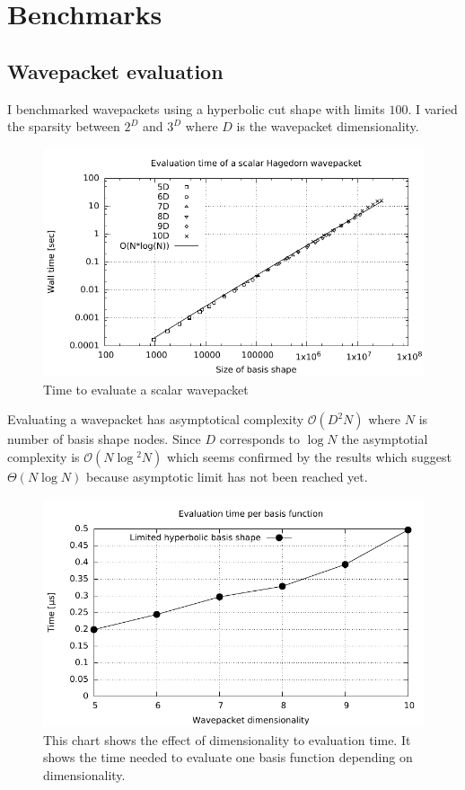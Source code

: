 \documentclass{article}
\begin{document}
\section{Benchmarks}

\subsection{Wavepacket evaluation}

I benchmarked wavepackets using a hyperbolic cut shape with limits \(100\).
I varied the sparsity between \(2^D\) and \(3^D\) where \(D\) is the wavepacket
dimensionality.

\begin{figure}[H]
  \centering
  \includegraphics[width=1.0\textwidth]{plots/hawp_eval_benchmark}
  \caption{Time to evaluate a scalar wavepacket}
  \label{fig:hawp_eval_benchmark}
\end{figure}

Evaluating a wavepacket has asymptotical complexity \(\mathcal{O}(D^2N)\) where
\(N\) is number of basis shape nodes.
Since \(D\) corresponds to \(\log{}N\) the asymptotial complexity is \(\mathcal{O}(N\log{}^2N)\)
which seems confirmed by the results which suggest \(\Theta(N\log{}N)\) because asymptotic limit
has not been reached yet.

\begin{figure}[H]
  \centering
  \includegraphics[width=1.0\textwidth]{plots/hawp_eval_efficiency}
  \caption{
    This chart shows the effect of dimensionality to evaluation time.
    It shows the time needed to evaluate one basis function depending
    on dimensionality.
  }
  \label{fig:hawp_eval_efficiency}
\end{figure}
\end{document}
